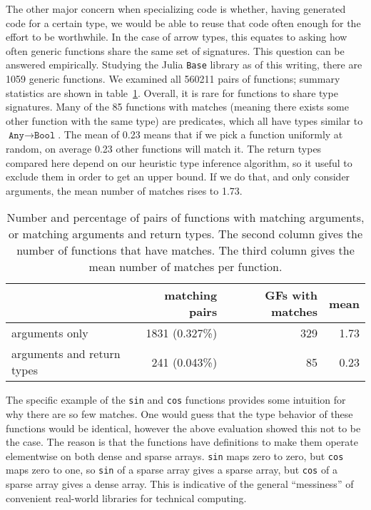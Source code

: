 The other major concern when specializing code is whether, having generated code
for a certain type, we would be able to reuse that code often enough for the
effort to be worthwhile.
In the case of arrow types, this equates to asking how often generic functions
share the same set of signatures.
This question can be answered empirically.
Studying the Julia \texttt{Base} library as of this writing, there are 1059
generic functions. We examined all 560211 pairs of functions; summary
statistics are shown in table~\ref{tab:matchingfuncs}.
Overall, it is rare for functions to share type signatures.
Many of the 85 functions with matches (meaning there exists some other function
with the same type) are predicates, which all have types similar to
$\texttt{Any}\rightarrow \texttt{Bool}$. The mean of 0.23 means that if we
pick a function uniformly at random, on average 0.23 other functions will
match it.
The return types compared here depend on our heuristic type inference algorithm,
so it useful to exclude them in order to get an upper bound.
If we do that, and only consider arguments, the mean number of matches rises to 1.73.

\begin{table}
  \begin{center}
    \begin{tabular}{|l|r|r|r|}\hline
    &  \textbf{matching pairs} & \textbf{GFs with matches} & \textbf{mean} \\
      \hline \hline
arguments only             & 1831 (0.327\%)  &   329       &          1.73 \\
\hline
arguments and return types &  241 (0.043\%)  &   85        &          0.23 \\
\hline
\end{tabular}
\end{center}
  \caption[Sharing of function types]{
\small{
    Number and percentage of pairs of functions with matching arguments, or
    matching arguments and return types. The second column gives the number of
    functions that have matches. The third column gives the
    mean number of matches per function.
}
  }
  \label{tab:matchingfuncs}
\end{table}

The specific example of the \texttt{sin} and \texttt{cos} functions provides
some intuition for why there are so few matches.
One would guess that the type behavior of these functions would be identical,
however the above evaluation showed this not to be the case.
The reason is that the functions have definitions to make them operate
elementwise on both dense and sparse arrays.
\texttt{sin} maps zero to zero, but \texttt{cos} maps zero to one,
so \texttt{sin} of a sparse array gives a sparse array, but
\texttt{cos} of a sparse array gives a dense array.
This is indicative of the general ``messiness'' of convenient real-world
libraries for technical computing.


